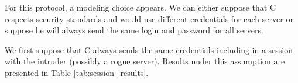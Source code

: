 For this protocol, a modeling choice appears.
We can either suppose that C respects security standards and would use different
credentials for each server or suppose he will always send the same login and
password for all servers.

We first suppose that C always sends the same credentials including in a session
with the intruder (possibly a rogue server).
Results under this assumption are presented in Table \ref{tab:session_results}.

\begin{table}[htb]
    \centering
    \caption{Results for  sub-protocol}
    \label{tab:session_results}
\end{table}

